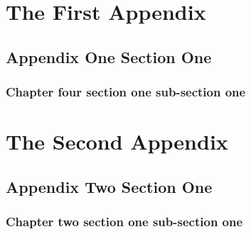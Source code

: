 \appendix
\renewcommand\thefigure{\thechapter.\arabic{figure}}
\renewcommand\thetable{\thechapter.\arabic{table}}

\chapter{The First Appendix}
\section{Appendix One Section One}
\subsection{Chapter four section one sub-section one}

\setcounter{figure}{0}
\setcounter{table}{0}
\chapter{The Second Appendix}
\section{Appendix Two Section One}
\subsection{Chapter two section one sub-section one}

